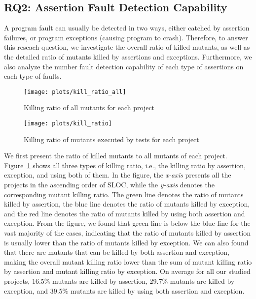 \subsection{RQ2: Assertion Fault Detection Capability}
A program fault can usually be detected in two ways, either catched by
assertion failures, or program exceptions (causing program to
crash). Therefore, to answer this reseach question, we investigate the
overall ratio of killed mutants, as well as the detailed ratio of
mutants killed by assertions and exceptions. Furthermore, we also analyze
the number fault detection capability of each type of assertions on
each type of faults.


\begin{figure}[t!]
\center
\texttt{[image: plots/kill\_ratio\_all]}
\caption{\label{fig:detect_amutant}Killing ratio of all mutants for each project}
\end{figure}


\begin{figure}[t!]
\center
\texttt{[image: plots/kill\_ratio]}
\caption{\label{fig:detect_cmutant}Killing ratio of mutants executed by tests for each project}
\end{figure}

We first present the ratio of killed mutants to all mutants of each
project. Figure~\ref{fig:detect_amutant} shows all three types of
killing ratio, i.e., the killing ratio by assertion, exception, and
using both of them. In the figure, the {\em x-axis} presents all
the projects in the ascending order of SLOC, while the {\em y-axis}
denotes the corresponding mutant killing ratio.  The green line
denotes the ratio of mutants killed by assertion, the blue line
denotes the ratio of mutants killed by exception, and the red line
denotes the ratio of mutants killed by using both assertion and
exception. From the figure, we found that green line is below the blue
line for the vast majority of the cases, indicating that the ratio of
mutants killed by assertion is usually lower than the ratio of mutants
killed by exception. We can also found that there are mutants that can
be killed by both assertion and exception, making the overall mutant
killing ratio lower than the sum of mutant killing ratio by assertion
and mutant killing ratio by exception. On average for all our studied
projects, 16.5\% mutants are killed by assertion, 29.7\% mutants are
killed by exception, and 39.5\% mutants are killed by using both
assertion and exception. 


